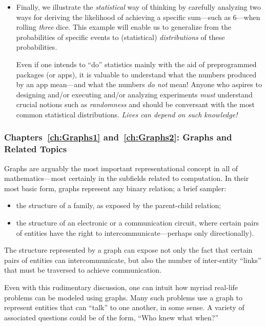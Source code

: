 \begin{itemize}
\item
Finally, we illustrate the {\em statistical} way of thinking by carefully analyzing two ways for deriving the likelihood of achieving a specific sum---such as $6$---when rolling {\em three} dice.  This example will enable us to generalize from the probabilities of specific events to (statistical) {\it distributions} of these probabilities.

\smallskip

Even if one intends to ``do'' statistics mainly with the aid of preprogrammed packages (or apps), it is valuable to understand what the numbers produced by an app mean---and what the numbers {\em do not} mean!   Anyone who aspires to designing and/or executing and/or analyzing experiments {\em must} understand crucial notions such as {\em randomness} and should be conversant with the most common statistical distributions.  {\em Lives can depend on such knowledge!}
\end{itemize}

\subsubsection{Chapters~\ref{ch:Graphs1} and~\ref{ch:Graphs2}: Graphs and Related Topics}

Graphs are arguably the most important representational concept in all of mathematics---most certainly in the subfields related to computation.  In their most basic form, graphs represent any binary relation; a brief sampler:
\begin{itemize}
\item
the structure of a family, as exposed by the parent-child relation;
\item
the structure of an electronic or a communication circuit, where certain pairs of entities have the right to intercommunicate---perhaps only directionally).
\end{itemize}
The structure represented by a graph can expose not only the fact that certain pairs of entities can intercommunicate, but also the number of inter-entity ``links'' that must be traversed to achieve communication.

Even with this rudimentary discussion, one can intuit how myriad real-life problems can be modeled using graphs.  Many such problems use a graph to represent entities that can ``talk'' to one another, in some sense.  A variety of associated questions could be of the form, ``Who knew what when?''

